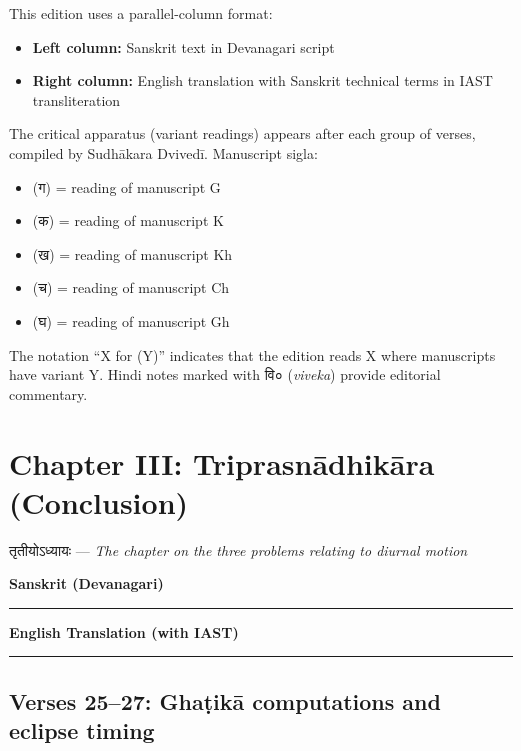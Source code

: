 \documentclass[11pt,a4paper]{article}
\newcommand{\dev}[1]{{\devanagarifont #1}}
\newcommand{\columnheaders}{%
  \noindent
  \begin{minipage}[t]{0.47\textwidth}
  \centering
  \textbf{\large Sanskrit (Devanagari)}\\[0.1cm]
  \rule{0.8\textwidth}{0.5pt}
  \end{minipage}%
  \hfill
  \begin{minipage}[t]{0.47\textwidth}
  \centering
  \textbf{\large English Translation (with IAST)}\\[0.1cm]
  \rule{0.8\textwidth}{0.5pt}
  \end{minipage}%
  \vspace{0.3cm}
  \par
}
\begin{document}
This edition uses a parallel-column format:
\begin{itemize}[label=\textbullet]
  \item \textbf{Left column:} Sanskrit text in Devanagari script
  \item \textbf{Right column:} English translation with Sanskrit technical terms in IAST transliteration
\end{itemize}

The critical apparatus (variant readings) appears after each group of verses, compiled
by Sudhākara Dvivedī. Manuscript sigla:
\begin{itemize}[label=\textbullet]
  \item \dev{(ग)} = reading of manuscript G
  \item \dev{(क)} = reading of manuscript K
  \item \dev{(ख)} = reading of manuscript Kh
  \item \dev{(च)} = reading of manuscript Ch
  \item \dev{(घ)} = reading of manuscript Gh
\end{itemize}

The notation ``X \dev{for} (Y)'' indicates that the edition reads X where manuscripts
have variant Y. Hindi notes marked with \dev{वि०} (\textit{viveka}) provide editorial
commentary.

\newpage

\section*{Chapter III: Triprasnādhikāra (Conclusion)}

\begin{center}
\dev{तृतीयोऽध्यायः} --- \textit{The chapter on the three problems relating to diurnal motion}
\end{center}

\vspace{0.3cm}
\columnheaders

\subsection*{Verses 25--27: Ghaṭikā computations and eclipse timing}
\end{document}
